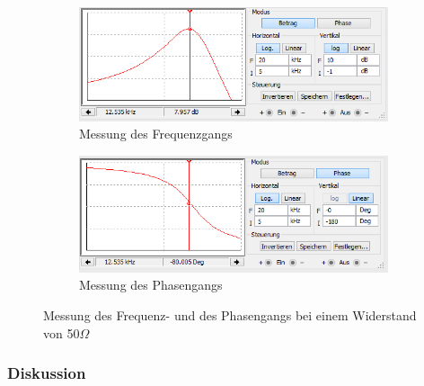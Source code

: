 \documentclass[12pt,a4paper]{article}
\begin{document}
\begin{figure}[H]
        \centering
        \begin{subfigure}[b]{0.48\textwidth}
                \includegraphics[width=\textwidth , scale = 0.4]{2_3_bode_betrag_50Ohm.PNG}
                \caption[Messung des Frequenzgangs]{Messung des Frequenzgangs}
 				 \label{fig:2_3_25_betrag}
        \end{subfigure}%
        \hfill
        \begin{subfigure}[b]{0.48\textwidth}
                \includegraphics[width=\textwidth , scale = 0.4]{2_3_bode_phase_50Ohm.PNG}
                \caption[Messung des Phasengangs]{Messung des Phasengangs}
  				\label{fig:2_3_25_phase}
        \end{subfigure}
        \caption{Messung des Frequenz- und des Phasengangs bei einem Widerstand von 50$\Omega$}
        \label{fig:2_3_2_2}
\end{figure}

\subsubsection{Diskussion}
\end{document}
